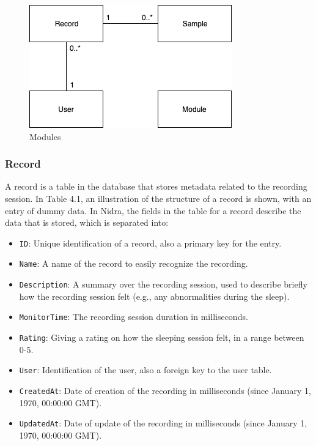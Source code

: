 \begin{figure}
    \centering
    \includegraphics[scale=0.6]{images/DataEntries.png}
    \caption{Modules}
    \label{fig:dataentries}
\end{figure}

\subsubsection{Record}

A record is a table in the database that stores metadata related to the recording session. In Table 4.1, an illustration of the structure of a record is shown, with an entry of dummy data. In Nidra, the fields in the table for a record describe the data that is stored, which is separated into:
\begin{itemize}
	\item \verb|ID|: Unique identification of a record, also a primary key for the entry.
	\item \verb|Name|: A name of the record to easily recognize the recording.
	\item \verb|Description|: A summary over the recording session, used to describe briefly how the recording session felt (e.g., any abnormalities during the sleep).
	\item \verb|MonitorTime|: The recording session duration in milliseconds.
	\item \verb|Rating|: Giving a rating on how the sleeping session felt, in a range between 0-5. 
	\item \verb|User|: Identification of the user, also a foreign key to the user table.
	\item \verb|CreatedAt|: Date of creation of the recording in milliseconds (since January 1, 1970, 00:00:00 GMT).
	\item \verb|UpdatedAt|: Date of update of the recording in milliseconds (since January 1, 1970, 00:00:00 GMT).
\end{itemize}


